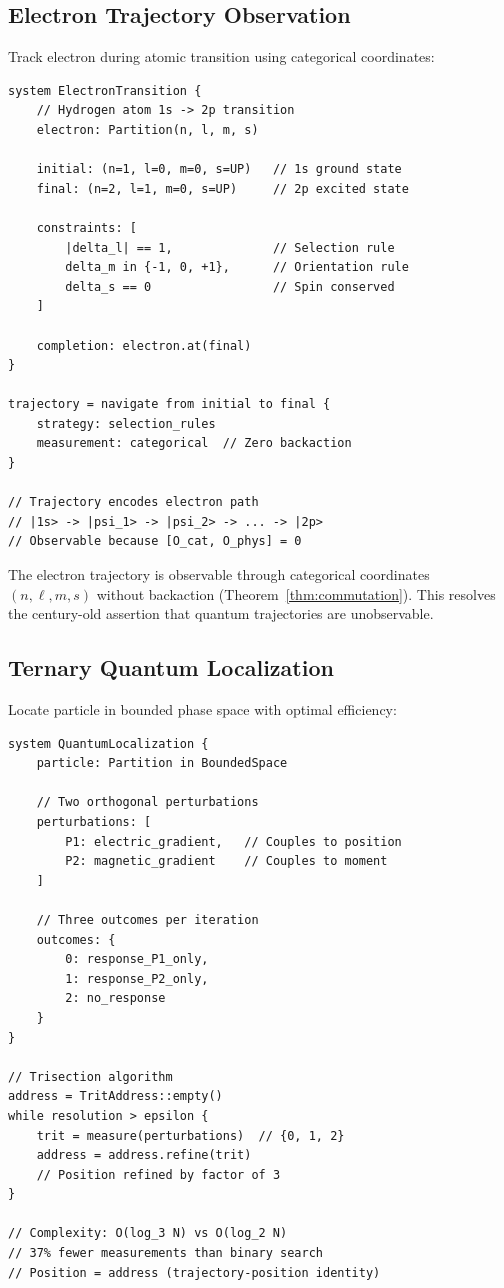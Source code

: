 \documentclass[twocolumn,10pt]{article}
\theoremstyle{remark}
\begin{document}
\subsection{Electron Trajectory Observation}

Track electron during atomic transition using categorical coordinates:

\begin{lstlisting}
system ElectronTransition {
    // Hydrogen atom 1s -> 2p transition
    electron: Partition(n, l, m, s)

    initial: (n=1, l=0, m=0, s=UP)   // 1s ground state
    final: (n=2, l=1, m=0, s=UP)     // 2p excited state

    constraints: [
        |delta_l| == 1,              // Selection rule
        delta_m in {-1, 0, +1},      // Orientation rule
        delta_s == 0                 // Spin conserved
    ]

    completion: electron.at(final)
}

trajectory = navigate from initial to final {
    strategy: selection_rules
    measurement: categorical  // Zero backaction
}

// Trajectory encodes electron path
// |1s> -> |psi_1> -> |psi_2> -> ... -> |2p>
// Observable because [O_cat, O_phys] = 0
\end{lstlisting}

The electron trajectory is observable through categorical coordinates $(n, \ell, m, s)$ without backaction (Theorem~\ref{thm:commutation}). This resolves the century-old assertion that quantum trajectories are unobservable.

\subsection{Ternary Quantum Localization}

Locate particle in bounded phase space with optimal efficiency:

\begin{lstlisting}
system QuantumLocalization {
    particle: Partition in BoundedSpace

    // Two orthogonal perturbations
    perturbations: [
        P1: electric_gradient,   // Couples to position
        P2: magnetic_gradient    // Couples to moment
    ]

    // Three outcomes per iteration
    outcomes: {
        0: response_P1_only,
        1: response_P2_only,
        2: no_response
    }
}

// Trisection algorithm
address = TritAddress::empty()
while resolution > epsilon {
    trit = measure(perturbations)  // {0, 1, 2}
    address = address.refine(trit)
    // Position refined by factor of 3
}

// Complexity: O(log_3 N) vs O(log_2 N)
// 37% fewer measurements than binary search
// Position = address (trajectory-position identity)
\end{lstlisting}
\end{document}

